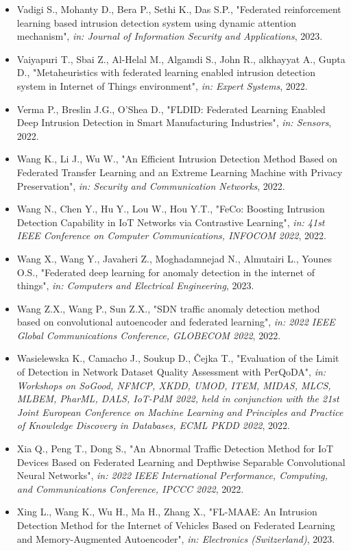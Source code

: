 \begin{itemize}
  \item Vadigi S., Mohanty D., Bera P., Sethi K., Das S.P., "Federated reinforcement learning based intrusion detection system using dynamic attention mechanism", \textit{in: Journal of Information Security and Applications}, 2023.
  \item Vaiyapuri T., Sbai Z., Al-Helal M., Algamdi S., John R., alkhayyat A., Gupta D., "Metaheuristics with federated learning enabled intrusion detection system in Internet of Things environment", \textit{in: Expert Systems}, 2022.
  \item Verma P., Breslin J.G., O’Shea D., "FLDID: Federated Learning Enabled Deep Intrusion Detection in Smart Manufacturing Industries", \textit{in: Sensors}, 2022.
  \item Wang K., Li J., Wu W., "An Efficient Intrusion Detection Method Based on Federated Transfer Learning and an Extreme Learning Machine with Privacy Preservation", \textit{in: Security and Communication Networks}, 2022.
  \item Wang N., Chen Y., Hu Y., Lou W., Hou Y.T., "FeCo: Boosting Intrusion Detection Capability in IoT Networks via Contrastive Learning", \textit{in: 41st IEEE Conference on Computer Communications, INFOCOM 2022}, 2022.
  \item Wang X., Wang Y., Javaheri Z., Moghadamnejad N., Almutairi L., Younes O.S., "Federated deep learning for anomaly detection in the internet of things", \textit{in: Computers and Electrical Engineering}, 2023.
  \item Wang Z.X., Wang P., Sun Z.X., "SDN traffic anomaly detection method based on convolutional autoencoder and federated learning", \textit{in: 2022 IEEE Global Communications Conference, GLOBECOM 2022}, 2022.
  \item Wasielewska K., Camacho J., Soukup D., Čejka T., "Evaluation of the Limit of Detection in Network Dataset Quality Assessment with PerQoDA", \textit{in: Workshops on SoGood, NFMCP, XKDD, UMOD, ITEM, MIDAS, MLCS, MLBEM, PharML, DALS, IoT-PdM 2022, held in conjunction with the 21st Joint European Conference on Machine Learning and Principles and Practice of Knowledge Discovery in Databases, ECML PKDD 2022}, 2022.
  \item Xia Q., Peng T., Dong S., "An Abnormal Traffic Detection Method for IoT Devices Based on Federated Learning and Depthwise Separable Convolutional Neural Networks", \textit{in: 2022 IEEE International Performance, Computing, and Communications Conference, IPCCC 2022}, 2022.
  \item Xing L., Wang K., Wu H., Ma H., Zhang X., "FL-MAAE: An Intrusion Detection Method for the Internet of Vehicles Based on Federated Learning and Memory-Augmented Autoencoder", \textit{in: Electronics (Switzerland)}, 2023.

\end{itemize}
